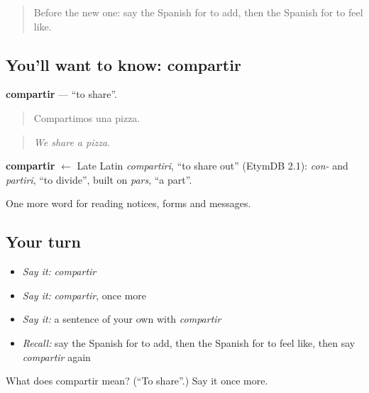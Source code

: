 \label{lesson:ES-C499-compartir}



\begin{quote}
Before the new one: say the Spanish for to add, then the Spanish for to feel like.
\end{quote}

\subsection*{You'll want to know: compartir}
\textbf{compartir} — \textquotedblleft{}to share\textquotedblright{}.

\begin{quote}
Compartimos una pizza.
\end{quote}

\begin{quote}
\emph{We share a pizza.}
\end{quote}

\begin{cousinweb}
\textbf{compartir} $\leftarrow$ Late Latin \emph{compartiri}, \textquotedblleft{}to share out\textquotedblright{} (EtymDB 2.1): \emph{con-} and \emph{partiri}, \textquotedblleft{}to divide\textquotedblright{}, built on \emph{pars}, \textquotedblleft{}a part\textquotedblright{}.
\end{cousinweb}

\begin{grammarlens}[title={What you've built}]
One more word for reading notices, forms and messages.
\end{grammarlens}

\subsection*{Your turn}
\begin{itemize}
\raggedright
  \item \emph{Say it:} \emph{compartir}
  \item \emph{Say it:} \emph{compartir}, once more
  \item \emph{Say it:} a sentence of your own with \emph{compartir}
  \item \emph{Recall:} say the Spanish for to add, then the Spanish for to feel like, then say \emph{compartir} again
\end{itemize}

\begin{tcolorbox}[breakable,colback=teal!4,colframe=teal!35!black,title={Before you move on}]
What does compartir mean? (\textquotedblleft{}To share\textquotedblright{}.) Say it once more.
\end{tcolorbox}
